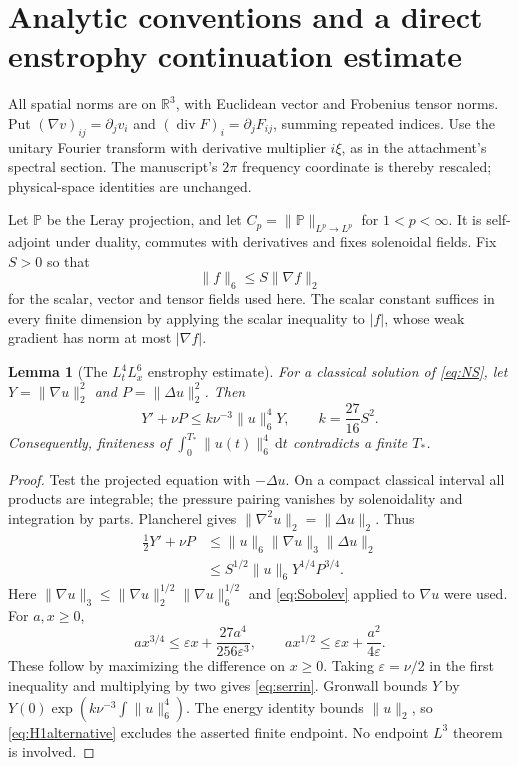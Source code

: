 \documentclass[11pt,a4paper]{article}
\newtheorem{lemma}[theorem]{Lemma}
\theoremstyle{definition}\newtheorem{definition}[theorem]{Definition}
\theoremstyle{remark}\newtheorem{remark}[theorem]{Remark}
\newcommand{\R}{\mathbb R}
\newcommand{\PP}{\mathbb P}
\newcommand{\dd}{\,\mathrm d}
\newcommand{\norm}[1]{\lVert #1\rVert}
\newcommand{\diver}{\operatorname{div}}
\numberwithin{equation}{section}
\begin{document}
\section{Analytic conventions and a direct enstrophy continuation estimate}
\label{sec:enstrophy}
All spatial norms are on $\R^3$, with Euclidean vector and Frobenius tensor norms. Put $(\nabla v)_{ij}=\partial_jv_i$ and $(\diver F)_i=\partial_jF_{ij}$, summing repeated indices. Use the unitary Fourier transform with derivative multiplier $i\xi$, as in the attachment's spectral section. The manuscript's $2\pi$ frequency coordinate is thereby rescaled; physical-space identities are unchanged.

Let $\PP$ be the Leray projection, and let $C_p=\norm{\PP}_{L^p\to L^p}$ for $1<p<\infty$. It is self-adjoint under duality, commutes with derivatives and fixes solenoidal fields. Fix $S>0$ so that
\begin{equation}\label{eq:Sobolev}
 \norm f_6\le S\norm{\nabla f}_2
\end{equation}
for the scalar, vector and tensor fields used here. The scalar constant suffices in every finite dimension by applying the scalar inequality to $|f|$, whose weak gradient has norm at most $|\nabla f|$.

\begin{lemma}[The $L^4_tL^6_x$ enstrophy estimate]\label{lem:serrin}
For a classical solution of \eqref{eq:NS}, let $Y=\norm{\nabla u}_2^2$ and $P=\norm{\Delta u}_2^2$. Then
\begin{equation}\label{eq:serrin}
 Y'+\nu P\le k\nu^{-3}\norm u_6^4Y,
 \qquad k=\frac{27}{16}S^2.
\end{equation}
Consequently, finiteness of $\int_0^{T_*}\norm{u(t)}_6^4\dd t$ contradicts a finite $T_*$.
\end{lemma}
\begin{proof}
Test the projected equation with $-\Delta u$. On a compact classical interval all products are integrable; the pressure pairing vanishes by solenoidality and integration by parts. Plancherel gives $\norm{\nabla^2u}_2=\norm{\Delta u}_2$. Thus
\begin{align*}
 \tfrac12Y'+\nu P
 &\le\norm u_6\norm{\nabla u}_3\norm{\Delta u}_2\\
 &\le S^{1/2}\norm u_6Y^{1/4}P^{3/4}.
\end{align*}
Here $\norm{\nabla u}_3\le\norm{\nabla u}_2^{1/2}\norm{\nabla u}_6^{1/2}$ and \eqref{eq:Sobolev} applied to $\nabla u$ were used. For $a,x\ge0$,
\begin{equation}\label{eq:Young}
 ax^{3/4}\le\varepsilon x+\frac{27a^4}{256\varepsilon^3},
 \qquad ax^{1/2}\le\varepsilon x+\frac{a^2}{4\varepsilon}.
\end{equation}
These follow by maximizing the difference on $x\ge0$. Taking $\varepsilon=\nu/2$ in the first inequality and multiplying by two gives \eqref{eq:serrin}. Gronwall bounds $Y$ by $Y(0)\exp(k\nu^{-3}\int\norm u_6^4)$. The energy identity bounds $\norm u_2$, so \eqref{eq:H1alternative} excludes the asserted finite endpoint. No endpoint $L^3$ theorem is involved.
\end{proof}
\end{document}
